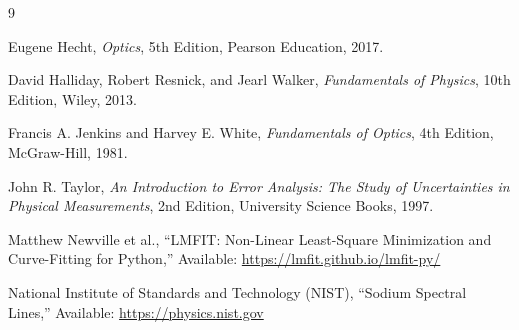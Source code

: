 \documentclass[11pt,a4paper]{article}
\begin{document}
\newpage
\begin{thebibliography}{9}

Eugene Hecht,
\textit{Optics},
5th Edition,
Pearson Education, 2017.

David Halliday, Robert Resnick, and Jearl Walker,
\textit{Fundamentals of Physics},
10th Edition,
Wiley, 2013.

Francis A. Jenkins and Harvey E. White,
\textit{Fundamentals of Optics},
4th Edition,
McGraw-Hill, 1981.

John R. Taylor,
\textit{An Introduction to Error Analysis: The Study of Uncertainties in Physical Measurements},
2nd Edition,
University Science Books, 1997.

Matthew Newville et al.,
“LMFIT: Non-Linear Least-Square Minimization and Curve-Fitting for Python,”
Available: \url{https://lmfit.github.io/lmfit-py/}

National Institute of Standards and Technology (NIST),
“Sodium Spectral Lines,”
Available: \url{https://physics.nist.gov}

\end{thebibliography}
\end{document}
